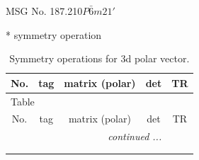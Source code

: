 \documentclass[fleqn,8pt]{jsarticle}
\begin{document}
\setcounter{MaxMatrixCols}{32}

\renewcommand{\tablename}{Table~}
\renewcommand{\figurename}{Figure~}
\begin{center}
\LARGE
MSG No. 187.210\quad$P\bar{6}m21'$
\end{center}
* symmetry operation
\renewcommand{\arraystretch}{1.3}
\begin{longtable}{ccccc}
\caption{Symmetry operations for 3d polar vector.}
 \\
 \hline \hline
No. & tag & matrix (polar) & det & TR \\ \hline \endfirsthead

\multicolumn{4}{l}{\tablename\ \thetable{}} \\
 \hline \hline
No. & tag & matrix (polar) & det & TR \\ \hline \endhead

 \hline \hline
\multicolumn{4}{r}{\footnotesize\it continued ...} \\ \endfoot

 \hline \hline
\multicolumn{4}{r}{} \\ \endlastfoot


\end{longtable}
\end{document}
